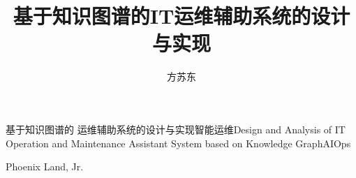 \title{基于知识图谱的IT运维辅助系统的设计与实现}{基于知识图谱的  运维辅助系统的设计与实现}{}{智能运维}{Design and Analysis of IT Operation and Maintenance Assistant System based on Knowledge Graph}{AIOps}
\author{方苏东}{Phoenix Land, Jr.}
\authorizedate{\today}
\committeechair{}
\reviewer{}{}
\makebigcover
\makecover
